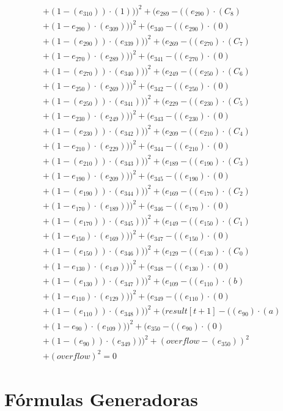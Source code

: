 \documentclass[10pt, a4paper]{article}
\begin{document}
\begin{align*}
& + (1 - (e_{310})) \cdot (1)))^{2} + (e_{289} - ((e_{290})  \cdot  (C_{8}) \\
& + (1 - e_{290})  \cdot  (e_{309})))^{2} + (e_{340} - ((e_{290}) \cdot (0) \\
& + (1 - (e_{290})) \cdot (e_{339})))^{2} + (e_{269} - ((e_{270})  \cdot  (C_{7}) \\
& + (1 - e_{270})  \cdot  (e_{289})))^{2} + (e_{341} - ((e_{270}) \cdot (0) \\
& + (1 - (e_{270})) \cdot (e_{340})))^{2} + (e_{249} - ((e_{250})  \cdot  (C_{6}) \\
& + (1 - e_{250})  \cdot  (e_{269})))^{2} + (e_{342} - ((e_{250}) \cdot (0) \\
& + (1 - (e_{250})) \cdot (e_{341})))^{2} + (e_{229} - ((e_{230})  \cdot  (C_{5}) \\
& + (1 - e_{230})  \cdot  (e_{249})))^{2} + (e_{343} - ((e_{230}) \cdot (0) \\
& + (1 - (e_{230})) \cdot (e_{342})))^{2} + (e_{209} - ((e_{210})  \cdot  (C_{4}) \\
& + (1 - e_{210})  \cdot  (e_{229})))^{2} + (e_{344} - ((e_{210}) \cdot (0) \\
& + (1 - (e_{210})) \cdot (e_{343})))^{2} + (e_{189} - ((e_{190})  \cdot  (C_{3}) \\
& + (1 - e_{190})  \cdot  (e_{209})))^{2} + (e_{345} - ((e_{190}) \cdot (0) \\
& + (1 - (e_{190})) \cdot (e_{344})))^{2} + (e_{169} - ((e_{170})  \cdot  (C_{2}) \\
& + (1 - e_{170})  \cdot  (e_{189})))^{2} + (e_{346} - ((e_{170}) \cdot (0) \\
& + (1 - (e_{170})) \cdot (e_{345})))^{2} + (e_{149} - ((e_{150})  \cdot  (C_{1}) \\
& + (1 - e_{150})  \cdot  (e_{169})))^{2} + (e_{347} - ((e_{150}) \cdot (0) \\
& + (1 - (e_{150})) \cdot (e_{346})))^{2} + (e_{129} - ((e_{130})  \cdot  (C_{0}) \\
& + (1 - e_{130})  \cdot  (e_{149})))^{2} + (e_{348} - ((e_{130}) \cdot (0) \\
& + (1 - (e_{130})) \cdot (e_{347})))^{2} + (e_{109} - ((e_{110})  \cdot  (b) \\
& + (1 - e_{110})  \cdot  (e_{129})))^{2} + (e_{349} - ((e_{110}) \cdot (0) \\
& + (1 - (e_{110})) \cdot (e_{348})))^{2} + (result[t+1] - ((e_{90})  \cdot  (a) \\
& + (1 - e_{90})  \cdot  (e_{109})))^{2} + (e_{350} - ((e_{90}) \cdot (0) \\
& + (1 - (e_{90})) \cdot (e_{349})))^{2} + (overflow - (e_{350}))^{2} \\
& + (overflow)^{2} = 0
\end{align*}\part{Fórmulas Generadoras}
\end{document}
